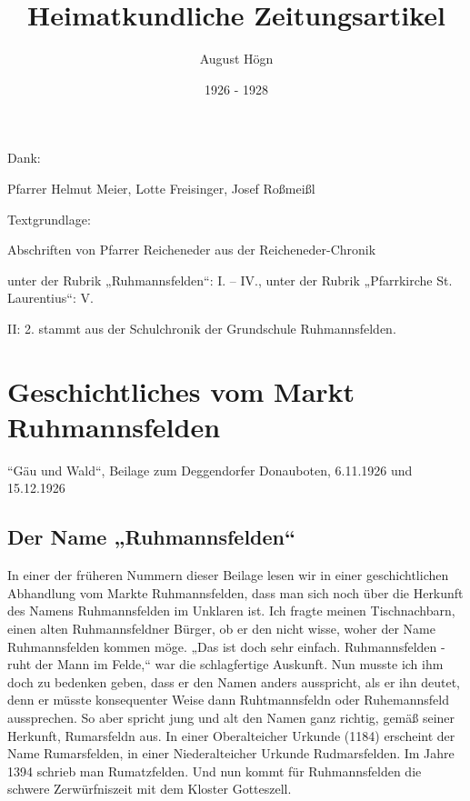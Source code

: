 \documentclass[12pt,a4paper]{book}
\author{August Högn}
\title{Heimatkundliche Zeitungsartikel}
\date{1926 - 1928}
\begin{document}
\maketitle

\begin{ersteseite}
Dank:

\bigskip

Pfarrer Helmut Meier, Lotte Freisinger, Josef Roßmeißl

\bigskip

Textgrundlage:

\bigskip

Abschriften von Pfarrer Reicheneder aus der Reicheneder-Chronik

\bigskip

unter der Rubrik „Ruhmannsfelden“: I. – IV., unter der Rubrik
„Pfarrkirche St. Laurentius“: V.

\bigskip

II: 2. stammt aus der Schulchronik der Grundschule Ruhmannsfelden.
\end{ersteseite}

\tableofcontents

\newpage

\chapter{Geschichtliches vom Markt Ruhmannsfelden}

“Gäu und Wald“, Beilage zum Deggendorfer Donauboten, 6.11.1926 und
15.12.1926

\section{Der Name „Ruhmannsfelden“}

In einer der früheren Nummern dieser Beilage lesen wir in einer
geschichtlichen Abhandlung vom Markte Ruhmannsfelden, dass man sich noch
über die Herkunft des Namens Ruhmannsfelden im Unklaren ist. Ich fragte
meinen Tischnachbarn, einen alten Ruhmannsfeldner Bürger, ob er den
nicht wisse, woher der Name Ruhmannsfelden kommen möge. „Das ist doch
sehr einfach. Ruhmannsfelden - ruht der Mann im Felde,“ war die
schlagfertige Auskunft. Nun musste ich ihm doch zu bedenken geben, dass
er den Namen anders ausspricht, als er ihn deutet, denn er müsste
konsequenter Weise dann Ruhtmannsfeldn oder Ruhemannsfeld aussprechen.
So aber spricht jung und alt den Namen ganz richtig, gemäß seiner
Herkunft, Rumarsfeldn aus. In einer Oberalteicher Urkunde (1184)
erscheint der Name Rumarsfelden, in einer Niederalteicher Urkunde
Rudmarsfelden. Im Jahre 1394 schrieb man Rumatzfelden. Und nun kommt für
Ruhmannsfelden die schwere Zerwürfniszeit mit dem Kloster Gotteszell.
\end{document}
